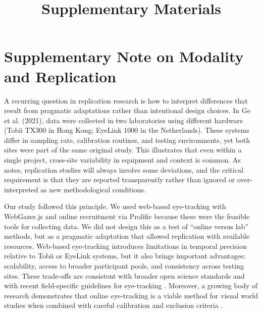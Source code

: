 \documentclass[sn-apa]{sn-jnl} %
\begin{document}
\title[Supplementary Materials]{Supplementary Materials}

\maketitle

\section*{Supplementary Note on Modality and Replication}

A recurring question in replication research is how to interpret differences
that result from pragmatic adaptations rather than intentional design choices.
In Ge et al. (2021), data were collected in two laboratories using different
hardware (Tobii TX300 in Hong Kong; EyeLink 1000 in the Netherlands). These
systems differ in sampling rate, calibration routines, and testing environments,
yet both sites were part of the same original study. This illustrates that even
within a single project, cross-site variability in equipment and context is
common. As \textcite{mcmanus2024} notes, replication studies will always involve
some deviations, and the critical requirement is that they are reported
transparently rather than ignored or over-interpreted as new methodological
conditions.

Our study followed this principle. We used web-based eye-tracking with
WebGazer.js and online recruitment via Prolific because these were the feasible
tools for collecting data. We did not design this as a test of “online versus
lab” methods, but as a pragmatic adaptation that allowed replication with
available resources. Web-based eye-tracking introduces limitations in temporal
precision relative to Tobii or EyeLink systems, but it also brings important
advantages: scalability, access to broader participant pools, and consistency
across testing sites. These trade-offs are consistent with broader open science
standards \parencite{goodman2016reproducibility} and with recent
field-specific guidelines for eye-tracking \parencite{godfroid2025}. Moreover,
a growing body of research demonstrates that online eye-tracking is a viable
method for visual world studies when combined with careful calibration and
exclusion criteria \parencite[e.g.,][]{bramlett2023,sharma2023online,li2022webvwp}. 
\end{document}
